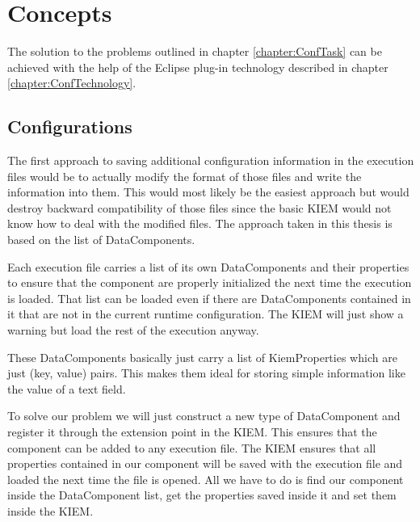 \chapter{Concepts}
\label{chapter:ConfConcepts}
The solution to the problems outlined in chapter \ref{chapter:ConfTask} can be achieved with
the help of the Eclipse plug-in technology described in chapter \ref{chapter:ConfTechnology}.

\section{Configurations}
\label{section:ConfConceptsConf}
The first approach to saving additional configuration information in the execution files would
be to actually modify the format of those files and write the information into them.
This would most likely be the easiest approach but would destroy backward compatibility of
those files since the basic \ac{KIEM} would not know how to deal with the modified files.
The approach taken in this thesis is based on the list of DataComponents.

Each execution file carries a list of its own DataComponents and their properties to ensure
that the component are properly initialized the next time the execution is loaded. That list
can be loaded even if there are DataComponents contained in it that are not in the current
runtime configuration. The \ac{KIEM} will just show a warning but load the rest of the execution
anyway. 

These DataComponents basically just carry a list of KiemProperties which are
just (key, value) pairs. This makes them ideal for storing simple information like the value
of a text field.

To solve our problem we will just construct a new type of DataComponent and register it through
the extension point in the \ac{KIEM}. This ensures that the component can be added to any execution
file. The \ac{KIEM} ensures that all properties contained in our component will be saved with
the execution file and loaded the next time the file is opened. All we have to do is
find our component inside the DataComponent list, get the properties saved inside it
and set them inside the \ac{KIEM}.


